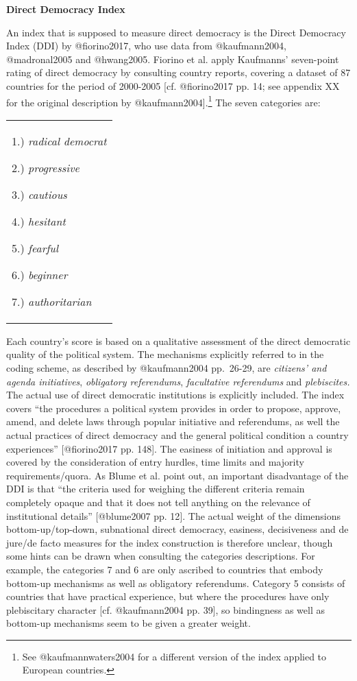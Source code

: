 \documentclass[]{article}
\let\rmarkdownfootnote\footnote%
\def\footnote{\protect\rmarkdownfootnote}
\begin{document}
\textbf{Direct Democracy Index}

An index that is supposed to measure direct democracy is the Direct
Democracy Index (DDI) by @fiorino2017, who use data from @kaufmann2004,
@madronal2005 and @hwang2005. Fiorino et al. apply Kaufmanns'
seven-point rating of direct democracy by consulting country reports,
covering a dataset of 87 countries for the period of 2000-2005 {[}cf.
@fiorino2017 pp. 14; see appendix XX for the original description by
@kaufmann2004{]}.\footnote{See @kaufmannwaters2004 for a different
  version of the index applied to European countries.} The seven
categories are:

\vspace{0.05cm}

\begin{tabular}{p{13.5cm}}
\small
    1.) \textit{radical democrat}
    
    2.) \textit{progressive}
    
    3.) \textit{cautious}
    
    4.) \textit{hesitant}
    
    5.) \textit{fearful}
    
    6.) \textit{beginner}
    
    7.) \textit{authoritarian}
\end{tabular}

Each country's score is based on a qualitative assessment of the direct
democratic quality of the political system. The mechanisms explicitly
referred to in the coding scheme, as described by @kaufmann2004
pp.~26-29, are \emph{citizens' and agenda initiatives}, \emph{obligatory
referendums}, \emph{facultative referendums} and \emph{plebiscites.} The
actual use of direct democratic institutions is explicitly included. The
index covers ``the procedures a political system provides in order to
propose, approve, amend, and delete laws through popular initiative and
referendums, as well the actual practices of direct democracy and the
general political condition a country experiences'' {[}@fiorino2017 pp.
148{]}. The easiness of initiation and approval is covered by the
consideration of entry hurdles, time limits and majority
requirements/quora. As Blume et al. point out, an important disadvantage
of the DDI is that ``the criteria used for weighing the different
criteria remain completely opaque and that it does not tell anything on
the relevance of institutional details'' {[}@blume2007 pp. 12{]}. The
actual weight of the dimensions bottom-up/top-down, subnational direct
democracy, easiness, decisiveness and de jure/de facto measures for the
index construction is therefore unclear, though some hints can be drawn
when consulting the categories descriptions. For example, the categories
7 and 6 are only ascribed to countries that embody bottom-up mechanisms
as well as obligatory referendums. Category 5 consists of countries that
have practical experience, but where the procedures have only
plebiscitary character {[}cf. @kaufmann2004 pp. 39{]}, so bindingness as
well as bottom-up mechanisms seem to be given a greater weight.
\end{document}
